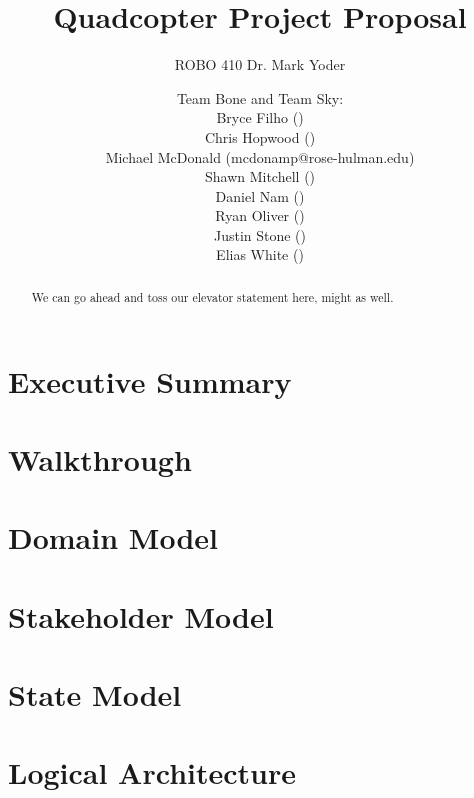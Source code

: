 \documentclass[a4paper,10pt]{scrartcl}
\title{Quadcopter Project Proposal}
\subtitle{ROBO 410 Dr. Mark Yoder}
\author{Team Bone and Team Sky: \\
	Bryce Filho () \\
	Chris Hopwood () \\
	Michael McDonald (mcdonamp@rose-hulman.edu) \\
	Shawn Mitchell () \\
	Daniel Nam () \\
	Ryan Oliver () \\
	Justin Stone () \\
	Elias White () \\
	}
\begin{document}
\maketitle

\begin{abstract}
We can go ahead and toss our elevator statement here, might as well.
\end{abstract}

\newpage

\tableofcontents

\newpage

\section{Executive Summary}

\section{Walkthrough}

\section{Domain Model}

\section{Stakeholder Model}

\section{State Model}

\section{Logical Architecture}
\end{document}
